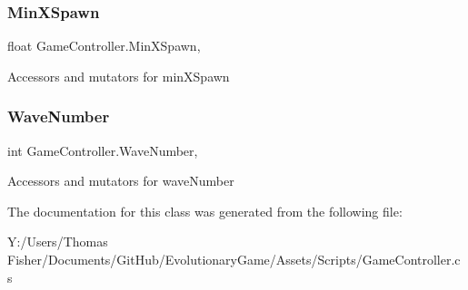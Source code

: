 \subsubsection{\texorpdfstring{Min\+X\+Spawn}{MinXSpawn}}
{\footnotesize\ttfamily float Game\+Controller.\+Min\+X\+Spawn\hspace{0.3cm}{\ttfamily [get]}, {\ttfamily [set]}}



Accessors and mutators for min\+X\+Spawn 

\mbox{\label{class_game_controller_a92b2683fc2816c409a0f727914607e36}} 
\subsubsection{\texorpdfstring{Wave\+Number}{WaveNumber}}
{\footnotesize\ttfamily int Game\+Controller.\+Wave\+Number\hspace{0.3cm}{\ttfamily [get]}, {\ttfamily [set]}}



Accessors and mutators for wave\+Number 



The documentation for this class was generated from the following file\+:\begin{DoxyCompactItemize}
\item 
Y\+:/\+Users/\+Thomas Fisher/\+Documents/\+Git\+Hub/\+Evolutionary\+Game/\+Assets/\+Scripts/Game\+Controller.\+cs\end{DoxyCompactItemize}
